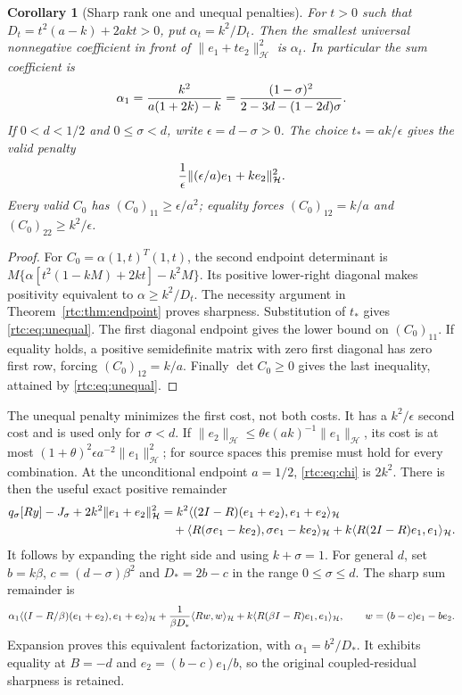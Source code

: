 \documentclass[11pt,a4paper]{article}
\numberwithin{equation}{section}
\newtheorem{corollary}[theorem]{Corollary}
\theoremstyle{definition}\newtheorem{definition}[theorem]{Definition}
\theoremstyle{remark}\newtheorem{remark}[theorem]{Remark}
\newcommand{\Hh}{\mathcal H}\newcommand{\Hw}{\mathcal H}
\newcommand{\ip}[2]{\langle#1,#2\rangle}\newcommand{\norm}[1]{\lVert#1\rVert}\newcommand{\abs}[1]{\lvert#1\rvert}
\begin{document}
\begin{corollary}[Sharp rank one and unequal penalties]\label{rtc:cor:penalties}
For $t>0$ such that $D_t=t^2(a-k)+2akt>0$, put
$\alpha_t=k^2/D_t$. Then the smallest universal nonnegative coefficient
in front of $\norm{e_1+te_2}_{\Hh}^2$ is $\alpha_t$.
In particular the sum coefficient is
\begin{equation}\label{rtc:eq:chi}
 \alpha_1={k^2\over a(1+2k)-k}
 ={(1-\sigma)^2\over 2-3d-(1-2d)\sigma}.
\end{equation}
If $0<d<1/2$ and $0\le\sigma<d$, write $\epsilon=d-\sigma>0$.
The choice $t_*=ak/\epsilon$ gives the valid penalty
\begin{equation}\label{rtc:eq:unequal}
 {1\over\epsilon}\norm{(\epsilon/a)e_1+ke_2}_{\Hh}^2.
\end{equation}
Every valid $C_0$ has $(C_0)_{11}\ge\epsilon/a^2$; equality forces
$(C_0)_{12}=k/a$ and $(C_0)_{22}\ge k^2/\epsilon$.
\end{corollary}
\begin{proof}
For $C_0=\alpha(1,t)^T(1,t)$, the second endpoint determinant is
$M\{\alpha[t^2(1-kM)+2kt]-k^2M\}$.
Its positive lower-right diagonal makes positivity equivalent to
$\alpha\ge k^2/D_t$. The necessity argument in
Theorem~\ref{rtc:thm:endpoint} proves sharpness. Substitution of $t_*$
gives \eqref{rtc:eq:unequal}. The first diagonal endpoint gives the lower
bound on $(C_0)_{11}$. If equality holds, a positive semidefinite matrix
with zero first diagonal has zero first row, forcing $(C_0)_{12}=k/a$.
Finally $\det C_0\ge0$ gives the last inequality, attained by
\eqref{rtc:eq:unequal}.
\end{proof}
The unequal penalty minimizes the first cost, not both costs. It has a
$k^2/\epsilon$ second cost and is used only for $\sigma<d$.
If $\norm{e_2}_{\Hh}\le\theta\epsilon(ak)^{-1}\norm{e_1}_{\Hh}$,
its cost is at most $(1+\theta)^2\epsilon a^{-2}\norm{e_1}_{\Hh}^2$;
for source spaces this premise must hold for every combination.
At the unconditional endpoint $a=1/2$, \eqref{rtc:eq:chi} is $2k^2$.
There is then the useful exact positive remainder
\begin{align}\label{rtc:eq:coarse-remainder}
 q_\sigma[Ry]-J_\sigma+2k^2\norm{e_1+e_2}_{\Hh}^2
 &=k^2\ip{(2I-R)(e_1+e_2)}{e_1+e_2}_{\Hh}\notag\\
 &\quad+\ip{R(\sigma e_1-ke_2)}{\sigma e_1-ke_2}_{\Hh}
 +k\ip{R(2I-R)e_1}{e_1}_{\Hh}.
\end{align}
It follows by expanding the right side and using $k+\sigma=1$.
For general $d$, set $b=k\beta$, $c=(d-\sigma)\beta^2$ and
$D_*=2b-c$ in the range $0\le\sigma\le d$. The sharp sum remainder is
\[
 \alpha_1\ip{(I-R/\beta)(e_1+e_2)}{e_1+e_2}_{\Hh}
 +{1\over\beta D_*}\ip{Rw}{w}_{\Hh}
 +k\ip{R(\beta I-R)e_1}{e_1}_{\Hh},\qquad
 w=(b-c)e_1-be_2.
\]
Expansion proves this equivalent factorization, with
$\alpha_1=b^2/D_*$. It exhibits equality at $B=-d$ and
$e_2=(b-c)e_1/b$, so the original coupled-residual sharpness is retained.
\end{document}
